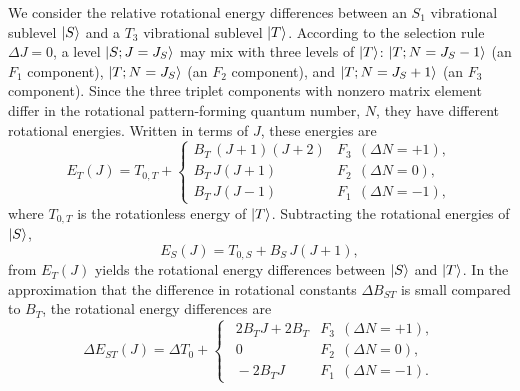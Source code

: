 \documentclass[12pt]{mitthesis}
\begin{document}
We consider the relative rotational energy differences between an
$S_1$ vibrational sublevel $\mathinner{|{S}\rangle}$ and a $T_3$ vibrational sublevel
$\mathinner{|{T}\rangle}$.  According to the selection rule $\Delta J = 0$, a level
$\mathinner{|{S;J=J_S}\rangle}$ may mix with three levels of $\mathinner{|{T}\rangle}$:
$\mathinner{|{T;N=J_S-1}\rangle}$ (an $F_1$ component), $\mathinner{|{T;N=J_S}\rangle}$ (an $F_2$
component), and $\mathinner{|{T;N=J_S+1}\rangle}$ (an $F_3$ component).  Since the
three triplet components with nonzero matrix element differ in the
rotational pattern-forming quantum number, $N$, they have different
rotational energies.  Written in terms of $J$, these energies are
\begin{equation}
  E_T(J) = T_{0,T} + 
  \begin{cases}
    B_T \, (J+1)(J+2) & F_3 \:\: (\Delta N = +1), \\
    B_T \, J(J+1)     & F_2 \:\: (\Delta N = 0), \\
    B_T \, J(J-1)     & F_1 \:\: (\Delta N = -1),
  \end{cases}
\end{equation}
where $T_{0,T}$ is the rotationless energy of $\mathinner{|{T}\rangle}$.  Subtracting
the rotational energies of $\mathinner{|{S}\rangle}$,
\begin{equation}
  E_S(J) = T_{0,S} + B_S \, J(J+1),
\end{equation}
from $E_T(J)$ yields the rotational energy differences between
$\mathinner{|{S}\rangle}$ and $\mathinner{|{T}\rangle}$.  In the approximation that the difference in
rotational constants $\Delta B_{ST}$ is small compared to $B_T$, the
rotational energy differences are
\begin{equation}
  \label{eq:components}
  \Delta E_{ST}(J) = \Delta T_0 +
  \begin{cases}
    \:\: 2B_TJ + 2 B_T 
    & F_3 \:\: (\Delta N = +1), \\
    \:\: 0
    & F_2 \:\: (\Delta N = 0), \\
    \:\: - 2B_TJ
    & F_1 \:\: (\Delta N = -1).
  \end{cases}
\end{equation}
\end{document}
